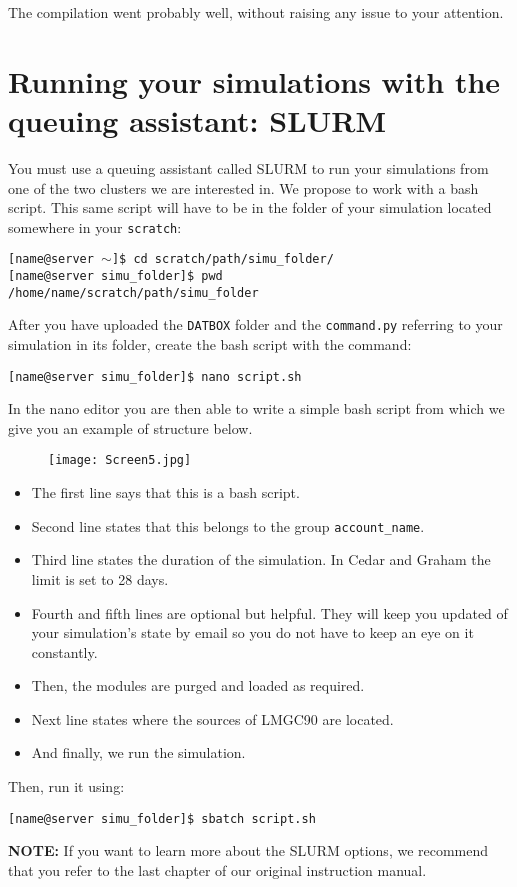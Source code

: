 \documentclass[12pt]{article}
\begin{document}
The compilation went probably well, without raising any issue to your attention.

\section*{Running your simulations with the queuing assistant: SLURM}

You must use a queuing assistant called SLURM to run your simulations from one of the two clusters we are interested in.  We propose to work with a bash script. This same script will have to be in the folder of your simulation located somewhere in your \texttt{scratch}:
\begin{tcolorbox}
\texttt{[name@server $\sim$]\$ cd scratch/path/simu\_folder/}\\
\texttt{[name@server simu\_folder]\$ pwd}\\
\texttt{/home/name/scratch/path/simu\_folder}
\end{tcolorbox}

After you have uploaded the \texttt{DATBOX} folder and the \texttt{command.py} referring to your simulation in its folder, create the bash script with the command:
\begin{tcolorbox}
\texttt{[name@server simu\_folder]\$ nano script.sh} 
\end{tcolorbox}

In the nano editor you are then able to write a simple bash script from which we give you an example of structure below.
\begin{figure}[H]
  \centering
  \texttt{[image: Screen5.jpg]}
\end{figure}
\begin{itemize}
    \item The first line says that this is a bash script.
    \item Second line states that this belongs to the group \texttt{account\_name}.
    \item Third line states the duration of the simulation. In Cedar and Graham the limit is set to 28 days.
    \item Fourth and fifth lines are optional but helpful. They will keep you updated of your simulation’s state by email so you do not have to keep an eye on it constantly.
    \item Then, the modules are purged and loaded as required.
    \item Next line states where the sources of LMGC90 are located.
    \item And finally, we run the simulation.
\end{itemize} 

Then, run it using:
\begin{tcolorbox}
\texttt{[name@server simu\_folder]\$ sbatch script.sh}
\end{tcolorbox}

\textbf{NOTE:} If you want to learn more about the SLURM options, we recommend that you refer to the last chapter of our original instruction manual.
\end{document}
